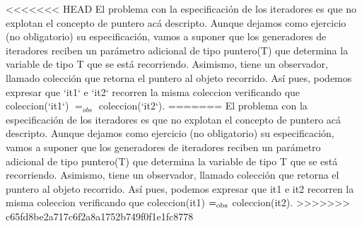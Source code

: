 <<<<<<< HEAD
\-El problema con la especificación de los iteradores es que no explotan el concepto de puntero acá descripto. \-Aunque dejamos como ejercicio (no obligatorio) su especificación, vamos a suponer que los generadores de iteradores reciben un parámetro adicional de tipo puntero(\-T) que determina la variable de tipo \-T que se está recorriendo. \-Asimismo, tiene un observador, llamado colección que retorna el puntero al objeto recorrido. \-Así pues, podemos expresar que `it1` e `it2` recorren la misma coleccion verificando que coleccion(`it1`) $=_{obs}$ coleccion(`it2`). 
=======
El problema con la especificación de los iteradores es que no explotan el concepto de puntero acá descripto. Aunque dejamos como ejercicio (no obligatorio) su especificación, vamos a suponer que los generadores de iteradores reciben un parámetro adicional de tipo puntero(\+T) que determina la variable de tipo T que se está recorriendo. Asimismo, tiene un observador, llamado colección que retorna el puntero al objeto recorrido. Así pues, podemos expresar que {\ttfamily it1} e {\ttfamily it2} recorren la misma coleccion verificando que coleccion({\ttfamily it1}) $=_{\rm obs}$ coleccion({\ttfamily it2}). 
>>>>>>> c65fd8be2a717c6f2a8a1752b749f0f1e1fc8778

